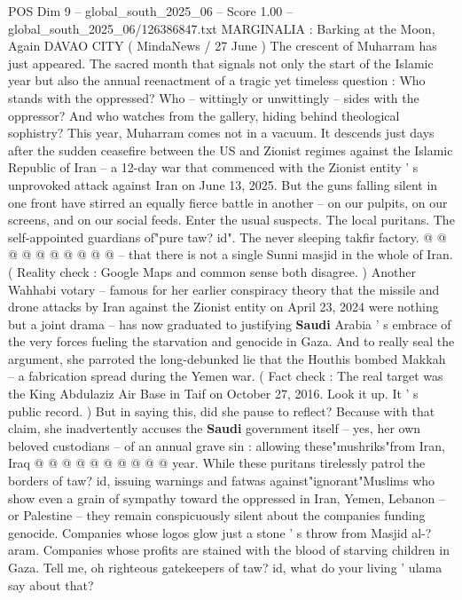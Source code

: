 \begin{textsample}{POS Dim 9 – global\_south\_2025\_06 – Score 1.00 – global\_south\_2025\_06/126386847.txt}  \label{ex:f9_pos_189}
MARGINALIA : Barking at the Moon, Again DAVAO CITY ( MindaNews / 27 June ) The crescent of Muharram has just appeared.
The sacred month that signals not only the start of the Islamic year but also the annual reenactment of a tragic yet timeless question : Who stands with the oppressed?
Who -- wittingly or unwittingly -- sides with the oppressor?
And who watches from the gallery, hiding behind theological sophistry?
This year, Muharram comes not in a vacuum.
It descends just days after the sudden ceasefire between the US and Zionist regimes against the Islamic Republic of Iran -- a 12-day war that commenced with the Zionist entity ' s unprovoked attack against Iran on June 13, 2025.
But the guns falling silent in one front have stirred an equally fierce battle in another -- on our pulpits, on our screens, and on our social feeds.
Enter the usual suspects.
The local puritans.
The self-appointed guardians of"pure taw? id".
The never sleeping takfir factory. @ @ @ @ @ @ @ @ @ @ -- that there is not a single Sunni masjid in the whole of Iran. ( Reality check : Google Maps and common sense both disagree. ) Another Wahhabi votary -- famous for her earlier conspiracy theory that the missile and drone attacks by Iran against the Zionist entity on April 23, 2024 were nothing but a joint drama -- has now graduated to justifying \textbf{Saudi} Arabia ' s embrace of the very forces fueling the starvation and genocide in Gaza.
And to really seal the argument, she parroted the long-debunked lie that the Houthis bombed Makkah -- a fabrication spread during the Yemen war. ( Fact check : The real target was the King Abdulaziz Air Base in Taif on October 27, 2016.
Look it up.
It ' s public record. ) But in saying this, did she pause to reflect?
Because with that claim, she inadvertently accuses the \textbf{Saudi} government itself -- yes, her own beloved custodians -- of an annual grave sin : allowing these"mushriks"from Iran, Iraq @ @ @ @ @ @ @ @ @ @ year.
While these puritans tirelessly patrol the borders of taw? id, issuing warnings and fatwas against"ignorant"Muslims who show even a grain of sympathy toward the oppressed in Iran, Yemen, Lebanon -- or Palestine -- they remain conspicuously silent about the companies funding genocide.
Companies whose logos glow just a stone ' s throw from Masjid al-? aram.
Companies whose profits are stained with the blood of starving children in Gaza.
Tell me, oh righteous gatekeepers of taw? id, what do your living ' ulama say about that?

\end{textsample}
